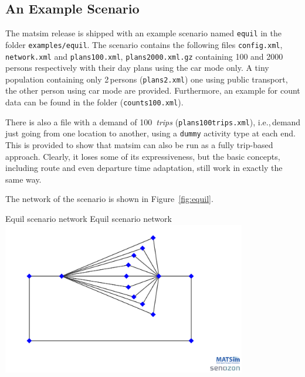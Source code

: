 \subsection{An Example Scenario}
The \gls{matsim} release is shipped with an example scenario named \lstinline|equil| in the folder \lstinline|examples/equil|. The scenario contains the following files \lstinline|config.xml|, \lstinline|network.xml| and \lstinline|plans100.xml|, \lstinline|plans2000.xml.gz| containing 100 and 2000\,persons respectively with their day plans using the car mode only. A tiny population containing only 2\,persons (\lstinline|plans2.xml|) one using public transport, the other person using car mode are provided. Furthermore, an example for count data can be found in the folder (\lstinline|counts100.xml|). 



There is also a file with a demand of 
100~\emph{trips} (\lstinline|plans100trips.xml|), i.e.,\,demand just going from one location to another, using a \lstinline$dummy$ activity type at each end.  This is provided to show that \gls{matsim} can also be run as a fully trip-based approach. Clearly, it loses some of its expressiveness, but the basic concepts, including route and even departure time adaptation, still work in exactly the same way.

The network of the scenario is shown in Figure~\ref{fig:equil}.

\createfigure%
{Equil scenario network}%
{Equil scenario network}%
{\label{fig:equil}}%
{\includegraphics[width=0.8\textwidth, angle=0]{using/figures/equil.png}}%
{}

